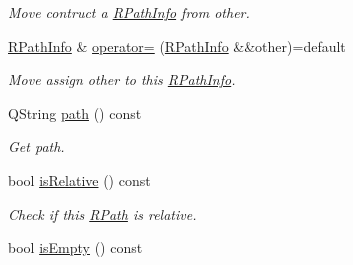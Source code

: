 \begin{DoxyCompactItemize}
\begin{DoxyCompactList}\small\item\em Move contruct a \hyperlink{class_mdt_1_1_deploy_utils_1_1_r_path_info}{R\+Path\+Info} from {\itshape other}. \end{DoxyCompactList}\item 
\hyperlink{class_mdt_1_1_deploy_utils_1_1_r_path_info}{R\+Path\+Info} \& \hyperlink{class_mdt_1_1_deploy_utils_1_1_r_path_info_ac359e6d34c91ad15f28f155664ef2e5d}{operator=} (\hyperlink{class_mdt_1_1_deploy_utils_1_1_r_path_info}{R\+Path\+Info} \&\&other)=default\hypertarget{class_mdt_1_1_deploy_utils_1_1_r_path_info_ac359e6d34c91ad15f28f155664ef2e5d}{}\label{class_mdt_1_1_deploy_utils_1_1_r_path_info_ac359e6d34c91ad15f28f155664ef2e5d}

\begin{DoxyCompactList}\small\item\em Move assign {\itshape other} to this \hyperlink{class_mdt_1_1_deploy_utils_1_1_r_path_info}{R\+Path\+Info}. \end{DoxyCompactList}\item 
Q\+String \hyperlink{class_mdt_1_1_deploy_utils_1_1_r_path_info_a26939bc215e6539e4ced8ebe4e9f81bf}{path} () const 
\begin{DoxyCompactList}\small\item\em Get path. \end{DoxyCompactList}\item 
bool \hyperlink{class_mdt_1_1_deploy_utils_1_1_r_path_info_ab5f084f284e64ebe6716c6a18fe09a07}{is\+Relative} () const \hypertarget{class_mdt_1_1_deploy_utils_1_1_r_path_info_ab5f084f284e64ebe6716c6a18fe09a07}{}\label{class_mdt_1_1_deploy_utils_1_1_r_path_info_ab5f084f284e64ebe6716c6a18fe09a07}

\begin{DoxyCompactList}\small\item\em Check if this \hyperlink{class_mdt_1_1_deploy_utils_1_1_r_path}{R\+Path} is relative. \end{DoxyCompactList}\item 
bool \hyperlink{class_mdt_1_1_deploy_utils_1_1_r_path_info_a237683187db518662b18646fad32a485}{is\+Empty} () const \hypertarget{class_mdt_1_1_deploy_utils_1_1_r_path_info_a237683187db518662b18646fad32a485}{}\label{class_mdt_1_1_deploy_utils_1_1_r_path_info_a237683187db518662b18646fad32a485}


\end{DoxyCompactItemize}
